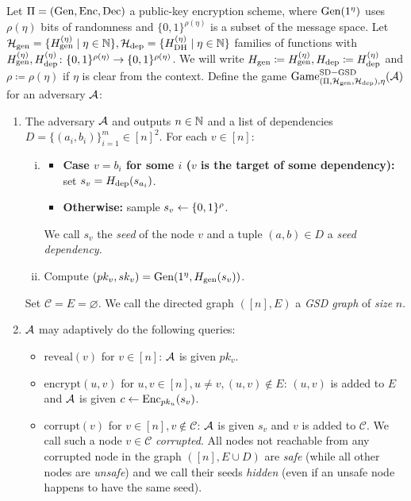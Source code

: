 \begin{definition} \label{def:sd-gsd-game}
	Let $\Pi = (\mathrm{Gen}, \mathrm{Enc}, \mathrm{Dec})$ a public-key encryption scheme, where $\mathrm{Gen}(1^\eta)$ uses $\rho(\eta)$ bits of randomness and $\{0, 1\}^{\rho(\eta)}$ is a subset of the message space.
	Let $\mathcal{H}_\mathrm{gen} = \{ H_\mathrm{gen}^{(\eta)} \mid \eta \in \mathbb{N}\}, \mathcal{H}_\mathrm{dep} = \{ H_\mathrm{DH}^{(\eta)} \mid \eta \in \mathbb{N}\}$ families of functions with $H_\mathrm{gen}^{(\eta)}, H_\mathrm{dep}^{(\eta)} \colon \{0, 1\}^{\rho(\eta)} \to \{0, 1\}^{\rho(\eta)}$. We will write $H_\mathrm{gen} \coloneqq H_\mathrm{gen}^{(\eta)}, H_\mathrm{dep} \coloneqq H_\mathrm{dep}^{(\eta)}$ and $\rho \coloneqq \rho(\eta)$ if $\eta$ is clear from the context.
	Define the game $\mathrm{Game}_{(\Pi, \mathcal{H}_\mathrm{gen}, \mathcal{H}_\mathrm{dep}), \eta}^{\mathrm{SD-GSD}}(\mathcal{A})$ for an adversary $\mathcal{A}$:
	\begin{enumerate}[1.]
		\item \label{def:sd-gsd-game-step-init} The adversary $\mathcal{A}$ and outputs $n \in \mathbb{N}$ and a list of dependencies $D = \{(a_{i}, b_{i})\}_{i=1}^m \in [n]^2$. For each $v \in [n]$:
		      \begin{enumerate}[(i)]
			      \item \begin{itemize}
				            \item \textbf{Case $v = b_i$ for some $i$ ($v$ is the target of some dependency):} set $s_v = H_\mathrm{dep}(s_{a_i})$.
				            \item \textbf{Otherwise:} sample $s_v \leftarrow \{0, 1\}^\rho$.
			            \end{itemize}
			            We call $s_v$ the \emph{seed} of the node $v$ and a tuple $(a, b) \in D$ a \emph{seed dependency}.
			      \item Compute $(pk_v, sk_v) = \mathrm{Gen}(1^\eta, H_\mathrm{gen}(s_v))$.
		      \end{enumerate}
		      Set $\mathcal{C} = E = \varnothing$. We call the directed graph $([n], E)$ a \emph{GSD graph} of \emph{size} $n$.
		\item $\mathcal{A}$ may adaptively do the following queries:
		      \begin{itemize}
			      \item $\mathrm{reveal}(v)$ for $v \in [n]$: $\mathcal{A}$ is given $pk_v$.
			      \item $\mathrm{encrypt}(u, v)$ for $u, v \in [n], u \neq v, (u, v) \notin E$: $(u, v)$ is added to $E$ and $\mathcal{A}$ is given $c \leftarrow \mathrm{Enc}_{pk_u}(s_v)$.
			      \item $\mathrm{corrupt}(v)$ for $v \in [n], v \notin \mathcal{C}$: $\mathcal{A}$ is given $s_v$ and $v$ is added to $\mathcal{C}$. We call such a node $v \in \mathcal{C}$ \emph{corrupted}. All nodes not reachable from any corrupted node in the graph $([n], E \cup D)$ are \emph{safe} (while all other nodes are \emph{unsafe}) and we call their seeds \emph{hidden} (even if an unsafe node happens to have the same seed).

\end{itemize}
\end{enumerate}
\end{definition}
